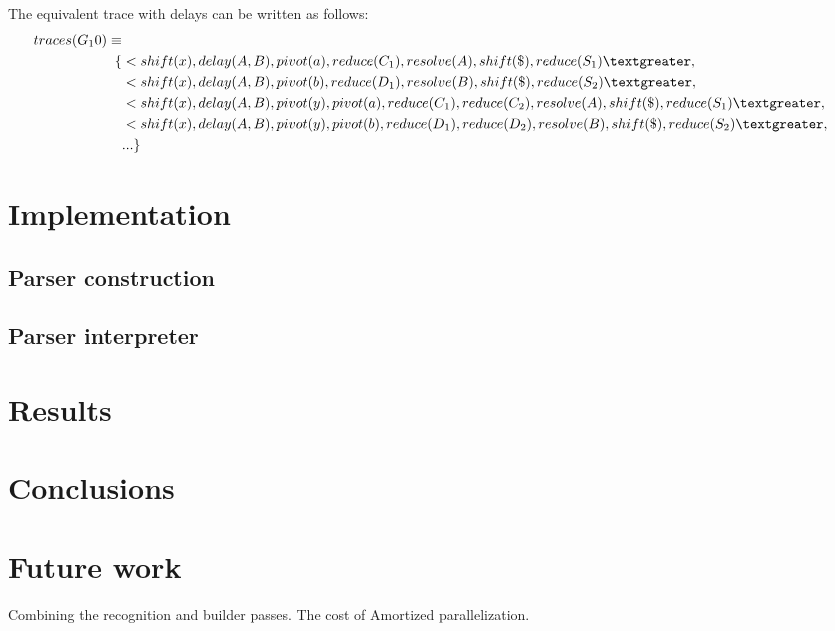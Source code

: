 \documentclass[11pt]{article}
\begin{document}
The equivalent trace with delays can be written as follows:
\begin{align*}
traces(G_10) \equiv \\
 \{ & \textless shift(x), delay(A, B), pivot(a), reduce(C_1), resolve(A), shift(\$), reduce(S_1) \textgreater,\\
    & \textless shift(x), delay(A, B), pivot(b), reduce(D_1), resolve(B), shift(\$), reduce(S_2) \textgreater,\\
    & \textless shift(x), delay(A, B), pivot(y), pivot(a), reduce(C_1), reduce(C_2), resolve(A), shift(\$), reduce(S_1) \textgreater,\\
    & \textless shift(x), delay(A, B), pivot(y), pivot(b), reduce(D_1), reduce(D_2), resolve(B), shift(\$), reduce(S_2) \textgreater,\\
    & ... \}
\end{align*}


\section{Implementation}
\subsection{Parser construction}
\subsection{Parser interpreter}

\section*{Results}

\section*{Conclusions}

\section*{Future work}

Combining the recognition and builder passes.
The cost of Amortized parallelization.
\end{document}
